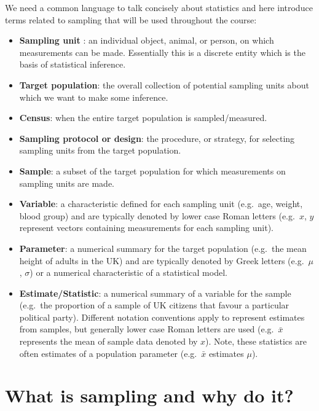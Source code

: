 \documentclass[
  oneside]{krantz}
\begin{document}
We need a common language to talk concisely about statistics and here introduce terms related to sampling that will be used throughout the course:

\begin{itemize}
\item
  \textbf{Sampling unit} : an individual object, animal, or person, on which measurements can be made. Essentially this is a discrete entity which is the basis of statistical inference.
\item
  \textbf{Target population}: the overall collection of potential sampling units about which we want to make some inference.
\item
  \textbf{Census}: when the entire target population is sampled/measured.
\item
  \textbf{Sampling protocol or design}: the procedure, or strategy, for selecting sampling units from the target population.
\item
  \textbf{Sample}: a subset of the target population for which measurements on sampling units are made.
\item
  \textbf{Variable}: a characteristic defined for each sampling unit (e.g.~age, weight, blood group) and are typically denoted by lower case Roman letters (e.g.~\(x\), \(y\) represent vectors containing measurements for each sampling unit).
\item
  \textbf{Parameter}: a numerical summary for the target population (e.g.~the mean height of adults in the UK) and are typically denoted by Greek letters (e.g.~\(\mu\), \(\sigma\)) or a numerical characteristic of a statistical model.
\item
  \textbf{Estimate/Statistic}: a numerical summary of a variable for the sample (e.g.~the proportion of a sample of UK citizens that favour a particular political party). Different notation conventions apply to represent estimates from samples, but generally lower case Roman letters are used (e.g.~\(\bar x\) represents the mean of sample data denoted by \(x\)). Note, these statistics are often estimates of a population parameter (e.g.~\(\bar x\) estimates \(\mu\)).
\end{itemize}

\hypertarget{what-is-sampling-and-why-do-it}{%
\section{What is sampling and why do it?}\label{what-is-sampling-and-why-do-it}}
\end{document}
